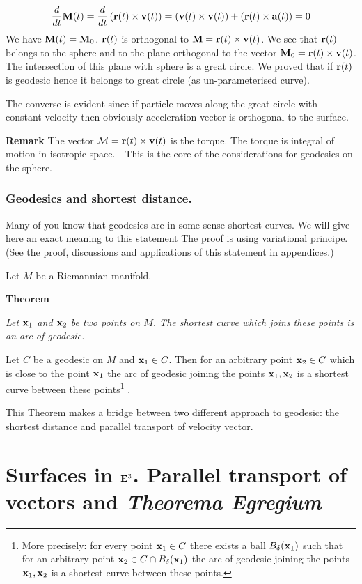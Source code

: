 \documentclass[12pt]{article}
\theoremstyle{theorem}
\numberwithin{equation}{section}
\begin{document}
               \begin{equation}\label{momentofmotion}
{d\over dt}{\bf M}(t)={d\over dt}\left({\bf r}(t)\times {\bf v}(t)\right)=
\left({\bf v}(t)\times {\bf v}(t)\right)+\left({\bf r}(t)\times {\bf a}(t)\right)=0
              \end{equation}
         We have ${\bf M}(t)={\bf M}_0$.  ${\bf r}(t)$ is orthogonal to ${\bf M}={\bf r}(t)\times {\bf v}(t)$.
         We see that ${\bf r}(t)$ belongs to the sphere and to the plane orthogonal to the vector ${\bf M}_0={\bf r}(t)\times {\bf v}(t)$.
         The intersection of this plane with sphere is a great circle.
         We proved that if ${\bf r}(t)$ is geodesic hence it belongs to great circle (as un-parameterised curve).

         The converse is evident since if particle moves along the great circle with constant velocity
         then obviously acceleration vector is orthogonal to the surface.

{\bf Remark} The vector ${\cal M}={\bf r}(t)\times {\bf v}(t)$ is the torque. The torque is integral of motion
 in isotropic space.---This is the core of the 
considerations for geodesics on the sphere.



\subsubsection { Geodesics and shortest distance.}
{\footnotesize
 Many of you know that geodesics are in some sense shortest curves.
 We will give here an  exact meaning to this statement 
The proof is using variational principe.
(See the proof, discussions and applications of this statement
in appendices.)

Let $M$ be a Riemannian manifold.

{\bf Theorem}
{\it Let ${\bf x}_1$ and ${\bf x}_2$ be two points on $M$.
The shortest curve which joins these points is an arc of geodesic.

Let $C$ be a geodesic on $M$ and  ${\bf x}_1\in C$. Then for an arbitrary point  ${\bf x}_2\in C$ which is
close to the point ${\bf x}_1$ the arc of geodesic joining the points ${\bf x}_1,{\bf x}_2$ is a shortest curve between
these points\footnote{More precisely: for every point ${\bf x}_1\in C$ there exists a ball $B_{\delta}({\bf x}_1)$
such that for an arbitrary point ${\bf x}_2\in C\cap B_{\delta}({\bf x}_1)$
the arc of geodesic joining the points ${\bf x}_1,{\bf x}_2$ is a shortest curve between
these points.}
.}

}
\m

  This Theorem makes a bridge between two different 
approach to geodesic: the shortest distance and
  parallel transport of velocity vector.




\section {Surfaces in ${\bf E}^3$. Parallel transport of vectors and 
{\it Theorema Egregium}}
\end{document}
